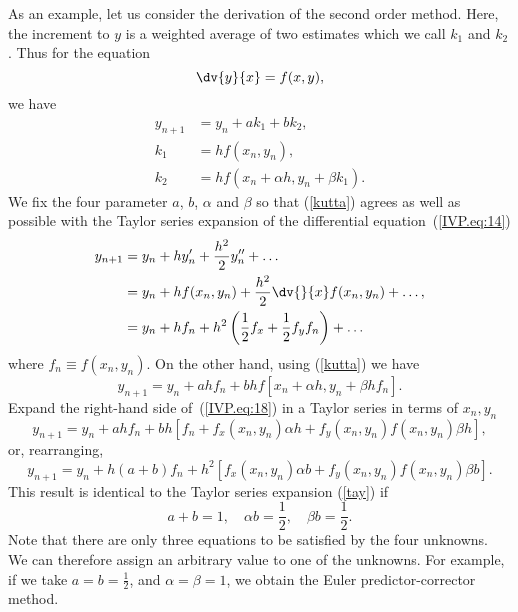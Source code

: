 As an example, let us consider the derivation of the second order
method.  Here, the increment to $y$ is a weighted average of two
estimates which we call $k_1$ and $k_2$. Thus for the equation
%
\begin{equation}
  \dv{y}{x} = f(x,y),
  \label{IVP.eq:14}
\end{equation}
%
we have
%
\begin{align}
  y_{n+1} & = y_n+a k_1+bk_2, \label{kutta} \\
  k_1    & = h f(x_n,y_n), \label{IVP.eq:15} \\
  k_2    & = h f(x_n + \alpha h, y_n + \beta k_1).\label{IVP.eq:16}
\end{align}
%
We fix the four parameter $a$, $b$, $\alpha$ and $\beta$ so that
(\ref{kutta}) agrees as well as possible with the Taylor series
expansion of the differential equation~(\ref{IVP.eq:14})
%
\begin{align}
  y_{n+1} &= y_n + h y_n' + \frac{h^2}{2} y_n'' + \ldots \nonumber \\
  &= y_n + h f(x_n,y_n) + \frac{h^2}{2} \dv{}{x} f(x_n,
  y_n) + \dots, \nonumber \\
  &= y_n + h f_n + h^2 \left (\frac{1}{2} f_x +
    \frac{1}{2}f_y f_n \right ) + \dots
  \label{tay}
\end{align}
%
where $f_n \equiv f(x_n,y_n)$.  On the other hand, using (\ref{kutta})
we have
%
\begin{equation}
  y_{n+1} = y_n + a h f_n + b h f[x_n+\alpha h, y_n+\beta h f_n].
  \label{IVP.eq:18}
\end{equation}
%
Expand the right-hand side of~(\ref{IVP.eq:18}) in a Taylor series
in terms of $x_n,y_n$
%
\begin{equation}
  y_{n+1} = y_n + a h f_n + b h \left [ f_n + f_x(x_n,y_n) \alpha h +
    f_y(x_n,y_n) f(x_n,y_n) \beta h \right ],
  \label{IVP.eq:19}
\end{equation}
%
or, rearranging,
%
\begin{equation}
  y_{n+1} = y_n + h (a+b) f_n + h^2 \left [ f_x(x_n,y_n) \alpha b +
    f_y(x_n,y_n) f(x_n,y_n) \beta b \right ].
  \label{IVP.eq:20}
\end{equation}
%
This result is identical to the Taylor series expansion (\ref{tay}) if
%
\begin{equation}
  a+b=1, \quad \alpha b=\frac{1}{2}, \quad\beta b=\frac{1}{2}.
  \label{IVP.eq:21}
\end{equation}
%
Note that there are only three equations to be satisfied by the four
unknowns. We can therefore assign an arbitrary value to one of the
unknowns. For example, if we take $a=b=\frac{1}{2}$, and
$\alpha=\beta=1$, we obtain the Euler predictor-corrector method.

